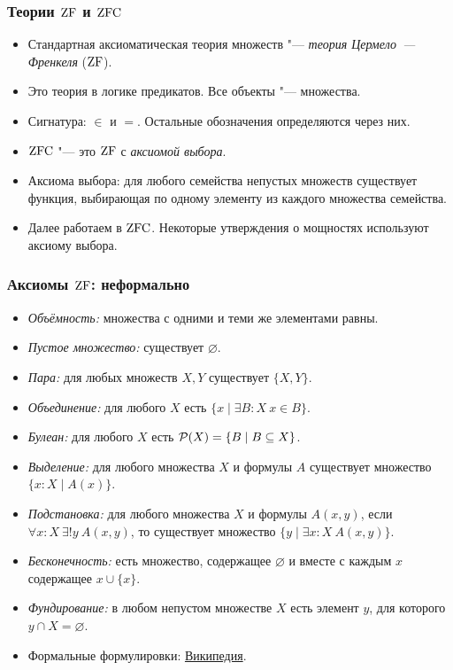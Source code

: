\documentclass[10pt]{beamer}
\begin{document}
\begin{frame}
    \frametitle{Теории $\mathrm{ZF}$ и $\mathrm{ZFC}$}
    \begin{itemize}
        \item Стандартная аксиоматическая теория множеств "--- \emph{теория Цермело~--- Френкеля} ($\mathrm{ZF}$).
        \item Это теория в логике предикатов. Все объекты "--- множества.
        \item Сигнатура: $\in$ и $=$. Остальные обозначения определяются через них.
        \item $\mathrm{ZFC}$ "--- это $\mathrm{ZF}$ с \emph{аксиомой выбора}.
        \item Аксиома выбора: для любого семейства непустых множеств существует функция, выбирающая по одному элементу из каждого множества семейства.
        \pause
        \item Далее работаем в $\mathrm{ZFC}$. Некоторые утверждения о мощностях используют аксиому выбора.
    \end{itemize}
\end{frame}

\begin{frame}
    \frametitle{Аксиомы $\mathrm{ZF}$: неформально}
    \begin{itemize}
        \item \emph{Объёмность:} множества с одними и теми же элементами равны.
        \item \emph{Пустое множество:} существует $\varnothing$.
        \item \emph{Пара:} для любых множеств $X,Y$ существует $\{X,Y\}$.
        \item \emph{Объединение:} для любого $X$ есть $\{x\mid \exists B:X~x\in B\}$.
        \item \emph{Булеан:} для любого $X$ есть $\mathcal{P}({X})=\{B\mid B\subseteq X\}$.
        \pause
        \item \emph{Выделение:} для любого множества $X$ и формулы $A$ существует множество $\{x:X\mid A(x)\}$.
        \item \emph{Подстановка:} для любого множества $X$ и формулы $A(x,y)$, если $\forall x:X~\exists!y~A(x,y)$, то существует множество $\{y\mid\exists x:X~A(x,y)\}$.
        \pause
        \item \emph{Бесконечность:} есть множество, содержащее $\varnothing$ и вместе с каждым $x$ содержащее $x\cup\{x\}$.
        \item \emph{Фундирование:} в любом непустом множестве $X$ есть элемент $y$, для которого $y\cap X=\varnothing$.
        \item Формальные формулировки: \href{https://ru.wikipedia.org/wiki/Система_Цермело_—_Френкеля}{Википедия}.
    \end{itemize}
\end{frame}
\end{document}
